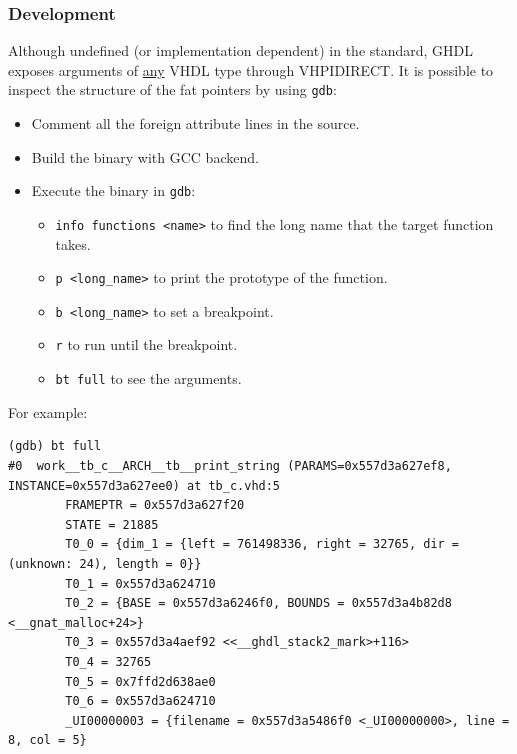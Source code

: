 \documentclass[
]{article}
\providecommand{\tightlist}{%
  \setlength{\itemsep}{0pt}\setlength{\parskip}{0pt}}
\begin{document}
\hypertarget{development}{%
\subsubsection{Development}\label{development}}

Although undefined (or implementation dependent) in the standard, GHDL exposes arguments of \href{https://ghdl.github.io/ghdl-cosim/vhpidirect/declarations.html\#restrictions-on-type-declarations}{any} VHDL type through VHPIDIRECT. It is possible to inspect the structure of the fat pointers by using \texttt{gdb}:

\begin{itemize}
\tightlist
\item
  Comment all the foreign attribute lines in the source.
\item
  Build the binary with GCC backend.
\item
  Execute the binary in \texttt{gdb}:

  \begin{itemize}
  \tightlist
  \item
    \texttt{info\ functions\ \textless{}name\textgreater{}} to find the long name that the target function takes.
  \item
    \texttt{p\ \textless{}long\_name\textgreater{}} to print the prototype of the function.
  \item
    \texttt{b\ \textless{}long\_name\textgreater{}} to set a breakpoint.
  \item
    \texttt{r} to run until the breakpoint.
  \item
    \texttt{bt\ full} to see the arguments.
  \end{itemize}
\end{itemize}

For example:

\begin{verbatim}
(gdb) bt full
#0  work__tb_c__ARCH__tb__print_string (PARAMS=0x557d3a627ef8, INSTANCE=0x557d3a627ee0) at tb_c.vhd:5
        FRAMEPTR = 0x557d3a627f20
        STATE = 21885
        T0_0 = {dim_1 = {left = 761498336, right = 32765, dir = (unknown: 24), length = 0}}
        T0_1 = 0x557d3a624710
        T0_2 = {BASE = 0x557d3a6246f0, BOUNDS = 0x557d3a4b82d8 <__gnat_malloc+24>}
        T0_3 = 0x557d3a4aef92 <<__ghdl_stack2_mark>+116>
        T0_4 = 32765
        T0_5 = 0x7ffd2d638ae0
        T0_6 = 0x557d3a624710
        _UI00000003 = {filename = 0x557d3a5486f0 <_UI00000000>, line = 8, col = 5}
\end{verbatim}
\end{document}
